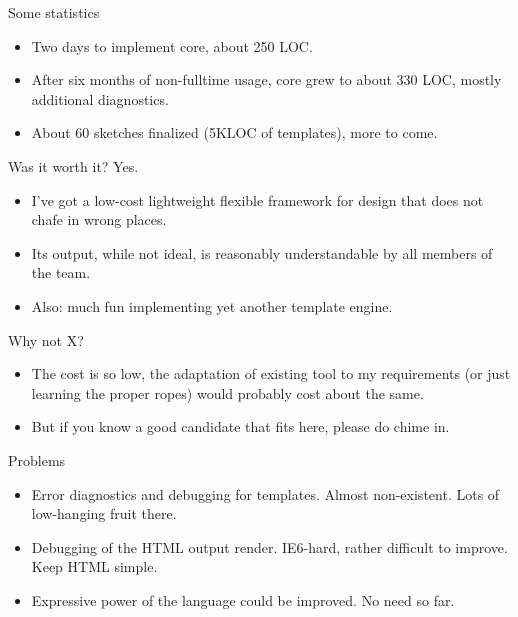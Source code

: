\documentclass[aspectratio=43,handout,bigger]{beamer}
\begin{document}
\begin{frame}{Some statistics}
  \begin{itemize}
    \item Two days to implement core, about 250 LOC.
    \item After six months of non-fulltime usage, core grew to about 330 LOC,
          mostly additional diagnostics.
    \item About 60 sketches finalized (5KLOC of templates), more to come.
  \end{itemize}
\end{frame}


\begin{frame}{Was it worth it?}
  Yes.
  \begin{itemize}
    \item I've got a low-cost lightweight flexible framework
          for design that does not chafe in wrong places.
    \item Its output, while not ideal, is reasonably understandable
          by all members of the team.
    \item Also: much fun implementing yet another template engine.
  \end{itemize}
\end{frame}


\begin{frame}{Why not X?}
  \begin{itemize}
    \item The cost is so low, the adaptation of existing tool to my requirements
          (or just learning the proper ropes) would probably cost
          about the same.
    \item But if you know a good candidate that fits here, please do chime in.
  \end{itemize}
\end{frame}


\begin{frame}{Problems}
  \begin{itemize}
    \item Error diagnostics and debugging for templates.
          Almost non-existent. Lots of low-hanging fruit there.
    \item Debugging of the HTML output render. IE6-hard,
          rather difficult to improve. Keep HTML simple.
    \item Expressive power of the language could be improved.
          No need so far.
  \end{itemize}
\end{frame}
\end{document}
